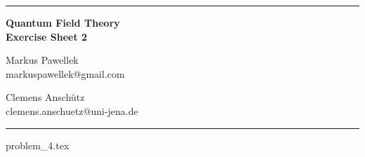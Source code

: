 \documentclass[a4paper,fleqn]{article}
\begin{document}
  \hrule
  \medskip
  \begin{center}
    \Large
    \textbf{Quantum Field Theory \\ Exercise Sheet 2}
  \end{center}
  \medskip
  \begin{minipage}[t]{0.45\textwidth}
    \begin{raggedleft}
      Markus Pawellek\\
      markuspawellek@gmail.com\\
    \end{raggedleft}
  \end{minipage}
  \hfill
  \begin{minipage}[t]{0.45\textwidth}
    Clemens Anschütz\\
    clemens.anschuetz@uni-jena.de
  \end{minipage}
  \medskip
  \hrule
  \bigskip

  {problem_4.tex}
\end{document}
